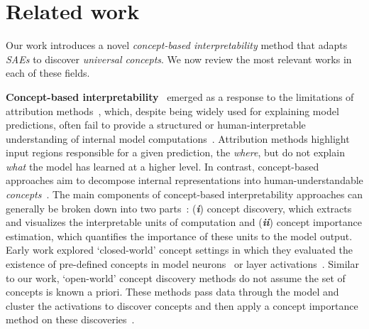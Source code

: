 \section{Related work}
Our work introduces a novel \textit{concept-based interpretability} method that adapts \textit{SAEs} to discover \textit{universal concepts}. We now review the most relevant works in each of these fields.

\noindent\textbf{Concept-based interpretability}~\cite{kim2018interpretability} emerged as a response to the limitations of attribution methods~\cite{simonyan2013deep,zeiler2014visualizing,bach2015pixel,springenberg2014striving,smilkov2017smoothgrad,sundararajan2017axiomatic,selvaraju2017grad,fong2019extremal,fel2021sobol,muzellec2023gradient}, which, despite being widely used for explaining model predictions, often fail to provide a structured or human-interpretable understanding of internal model computations~\cite{hase2020evaluating,hsieh2020evaluations,nguyen2021effectiveness,fel2021cannot,kim2021hive,sixt2020explanations}. Attribution methods highlight input regions responsible for a given prediction, the \textit{where}, but do not explain \textit{what} the model has learned at a higher level. In contrast, concept-based approaches aim to decompose internal representations into human-understandable \textit{concepts}~\cite{genone2012concept}. The main components of concept-based interpretability approaches can generally be broken down into two parts~\cite{fel2023holistic}: (\textbf{\textit{i}}) concept discovery, which extracts and visualizes the interpretable units of computation and (\textbf{\textit{ii}}) concept importance estimation, which quantifies the importance of these units to the model output. Early work explored `closed-world' concept settings in which they evaluated the existence of pre-defined concepts in model neurons~\cite{bau2017network} or layer activations~\cite{kim2018interpretability}. Similar to our work, `open-world' concept discovery methods do not assume the set of concepts is known a priori. These methods pass data through the model and cluster the activations to discover concepts and then apply a concept importance method on these discoveries~\cite{ghorbani2019towards,zhang2021invertible,fel2023craft,graziani2023concept,vielhaben2023multi,kowal2024understanding,kowal2024visual}. 




